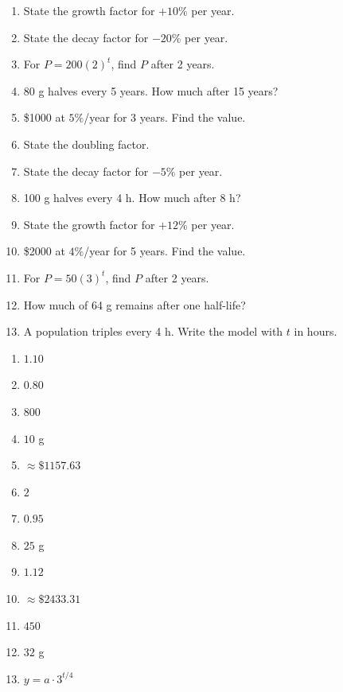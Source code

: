 \documentclass[11pt]{article}
\begin{document}
\begin{recapbox}
\begin{multicols}{2}
\small
\begin{enumerate}[leftmargin=*,itemsep=3pt]
  \item State the growth factor for $+10\%$ per year.
  \item State the decay factor for $-20\%$ per year.
  \item For $P=200(2)^t$, find $P$ after 2 years.
  \item 80 g halves every 5 years. How much after 15 years?
  \item \$1000 at $5\%$/year for 3 years. Find the value.
  \item State the doubling factor.
  \item State the decay factor for $-5\%$ per year.
  \item 100 g halves every 4 h. How much after 8 h?
  \item State the growth factor for $+12\%$ per year.
  \item \$2000 at $4\%$/year for 5 years. Find the value.
  \item For $P=50(3)^t$, find $P$ after 2 years.
  \item How much of 64 g remains after one half-life?
  \item A population triples every 4 h. Write the model with $t$ in hours.
\end{enumerate}
\end{multicols}
\end{recapbox}

\begin{keybox}
\begin{multicols}{2}
\small
\begin{enumerate}[leftmargin=*,itemsep=3pt]
  \item $1.10$
  \item $0.80$
  \item $800$
  \item $10$ g
  \item $\approx\$1157.63$
  \item $2$
  \item $0.95$
  \item $25$ g
  \item $1.12$
  \item $\approx\$2433.31$
  \item $450$
  \item $32$ g
  \item $y=a\cdot3^{t/4}$
\end{enumerate}
\end{multicols}
\end{keybox}
\end{document}
